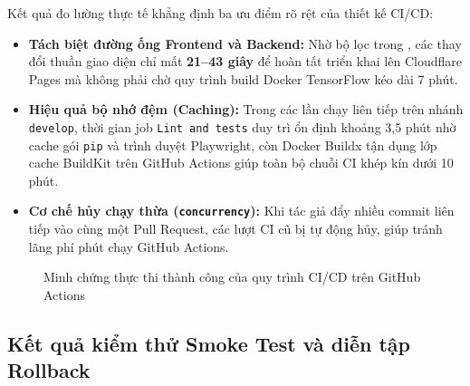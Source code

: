 Kết quả đo lường thực tế khẳng định ba ưu điểm rõ rệt của thiết kế CI/CD:
\begin{itemize}
    \item \textbf{Tách biệt đường ống Frontend và Backend:} Nhờ bộ lọc  trong , các thay đổi thuần giao diện chỉ mất \textbf{21--43 giây} để hoàn tất triển khai lên Cloudflare Pages mà không phải chờ quy trình build Docker TensorFlow kéo dài 7 phút.
    \item \textbf{Hiệu quả bộ nhớ đệm (Caching):} Trong các lần chạy liên tiếp trên nhánh \texttt{develop}, thời gian job \texttt{Lint and tests} duy trì ổn định khoảng 3,5 phút nhờ cache gói \texttt{pip} và trình duyệt Playwright, còn Docker Buildx tận dụng lớp cache BuildKit trên GitHub Actions giúp toàn bộ chuỗi CI khép kín dưới 10 phút.
    \item \textbf{Cơ chế hủy chạy thừa (\texttt{concurrency}):} Khi tác giả đẩy nhiều commit liên tiếp vào cùng một Pull Request, các lượt CI cũ bị tự động hủy, giúp tránh lãng phí phút chạy GitHub Actions.
\end{itemize}

\begin{figure}[H]
\centering
{}
\caption{Minh chứng thực thi thành công của quy trình CI/CD trên GitHub Actions}
\label{fig:ci_cd_run_summary}
\end{figure}

\subsection{Kết quả kiểm thử Smoke Test và diễn tập Rollback}
\label{subsec:tinh_on_dinh_git}

